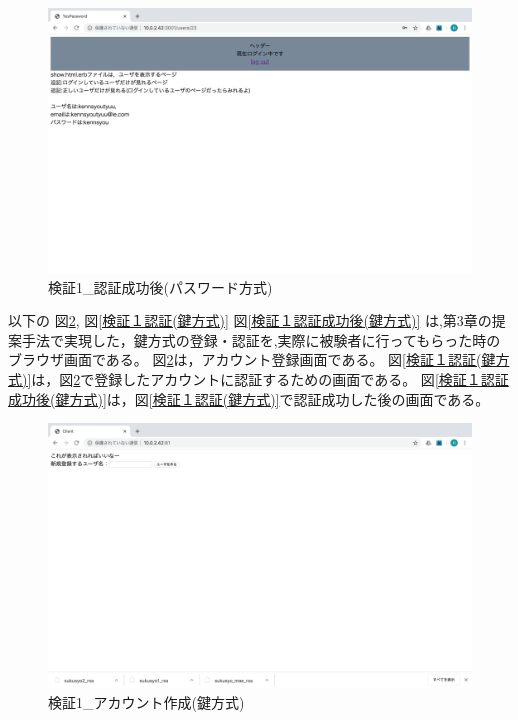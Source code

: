     \vspace{4cm}%
    \begin{figure}[H]
        \includegraphics[width=15cm]{./fig/chapter4/inspect_1/password_screnn/success.png}
        \caption{検証1\_認証成功後(パスワード方式)}
        \label{検証１認証成功後(パスワード方式)}
    \end{figure}








    \newpage
    \newpage

    以下の
    図\ref{検証１アカウント作成(鍵方式)},
    図\ref{検証１認証(鍵方式)}
    図\ref{検証１認証成功後(鍵方式)}
    は,第3章の提案手法で実現した，鍵方式の登録・認証を,実際に被験者に行ってもらった時のブラウザ画面である。
    図\ref{検証１アカウント作成(鍵方式)}は，アカウント登録画面である。
    図\ref{検証１認証(鍵方式)}は，図\ref{検証１アカウント作成(鍵方式)}で登録したアカウントに認証するための画面である。
    図\ref{検証１認証成功後(鍵方式)}は，図\ref{検証１認証(鍵方式)}で認証成功した後の画面である。
    \vspace{4cm}%
    \begin{figure}[H]
        \includegraphics[width=15cm]{./fig/chapter4/inspect_1/key_screnn/sign_up.png}
        \caption{検証1\_アカウント作成(鍵方式)}
        \label{検証１アカウント作成(鍵方式)}
    \end{figure}

